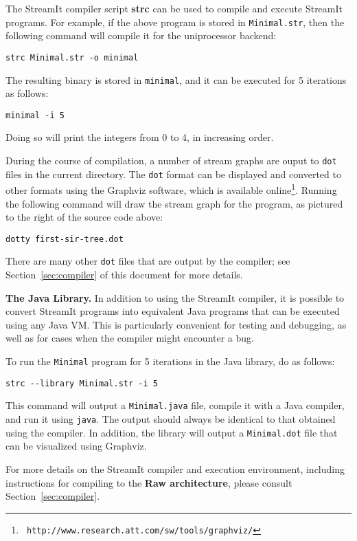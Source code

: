 The StreamIt compiler script {\bf strc} can be used to compile and
execute StreamIt programs.  For example, if the above program is
stored in {\tt Minimal.str}, then the following command will compile
it for the uniprocessor backend:
\begin{verbatim}
strc Minimal.str -o minimal
\end{verbatim}
The resulting binary is stored in {\tt minimal}, and it can be
executed for 5 iterations as follows:
\begin{verbatim}
minimal -i 5
\end{verbatim}
Doing so will print the integers from 0 to 4, in increasing order.

During the course of compilation, a number of stream graphs are ouput
to {\tt dot} files in the current directory.  The {\tt dot} format can
be displayed and converted to other formats using the Graphviz
software, which is available online\footnote{\tt
http://www.research.att.com/sw/tools/graphviz/}.  Running the
following command will draw the stream graph for the program, as
pictured to the right of the source code above:
\begin{verbatim}
dotty first-sir-tree.dot
\end{verbatim}
There are many other {\tt dot} files that are output by the compiler;
see Section~\ref{sec:compiler} of this document for more details.

{\bf The Java Library.}  In addition to using the StreamIt compiler,
it is possible to convert StreamIt programs into equivalent Java
programs that can be executed using any Java VM.  This is particularly
convenient for testing and debugging, as well as for cases when the
compiler might encounter a bug.

To run the {\tt Minimal} program for 5 iterations in the Java library,
do as follows:
\begin{verbatim}
strc --library Minimal.str -i 5
\end{verbatim}
This command will output a {\tt Minimal.java} file, compile it with a
Java compiler, and run it using {\tt java}.  The output should always
be identical to that obtained using the compiler.  In addition, the
library will output a {\tt Minimal.dot} file that can be visualized
using Graphviz.

For more details on the StreamIt compiler and execution environment,
including instructions for compiling to the {\bf Raw architecture},
please consult Section~\ref{sec:compiler}.
